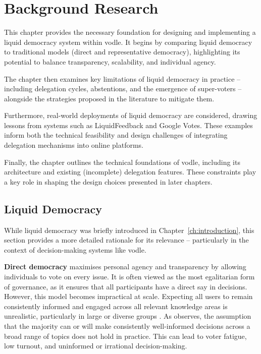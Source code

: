 \chapter{Background Research}\label{ch:background}
This chapter provides the necessary foundation for designing and implementing a liquid democracy system within vodle. It begins by comparing liquid democracy to traditional models (direct and representative democracy), highlighting its potential to balance transparency, scalability, and individual agency.

The chapter then examines key limitations of liquid democracy in practice -- including delegation cycles, abstentions, and the emergence of super-voters -- alongside the strategies proposed in the literature to mitigate them.

Furthermore, real-world deployments of liquid democracy are considered, drawing lessons from systems such as LiquidFeedback and Google Votes. These examples inform both the technical feasibility and design challenges of integrating delegation mechanisms into online platforms.

Finally, the chapter outlines the technical foundations of vodle, including its architecture and existing (incomplete) delegation features. These constraints play a key role in shaping the design choices presented in later chapters.
\section{Liquid Democracy}

While liquid democracy was briefly introduced in Chapter~\ref{ch:introduction}, this section provides a more detailed rationale for its relevance -- particularly in the context of decision-making systems like vodle.

\textbf{Direct democracy} maximises personal agency and transparency by allowing individuals to vote on every issue. It is often viewed as the most egalitarian form of governance, as it ensures that all participants have a direct say in decisions. However, this model becomes impractical at scale. Expecting all users to remain consistently informed and engaged across all relevant knowledge areas is unrealistic, particularly in large or diverse groups \citep{ford_delegative_2002}. As \citet{ford_delegative_2002} observes, the assumption that the majority can or will make consistently well-informed decisions across a broad range of topics does not hold in practice. This can lead to voter fatigue, low turnout, and uninformed or irrational decision-making.

